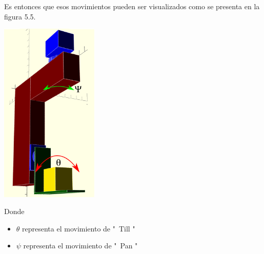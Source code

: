 Es entonces que esos movimientos pueden ser visualizados como se presenta en la figura 5.5.
\begin{center}
	\includegraphics[width=0.35\textwidth]{Contenido/Cuerpo/Capitulo5/Fig15.eps}
	\label{Fig1}
\end{center}
Donde
\begin{itemize}
	\item $\theta$ representa el movimiento de "\ Till "
	\item $\psi$ representa el movimiento de "\ Pan  "
\end{itemize}

